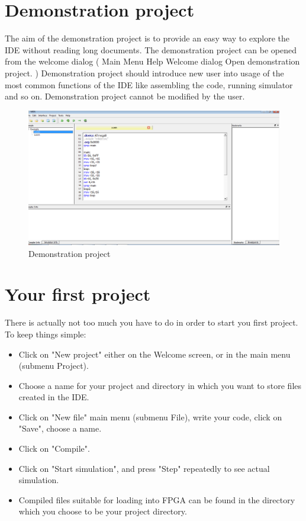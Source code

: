 
\section{Demonstration project}
    The aim of the demonstration project is to provide an easy way to explore the IDE without reading long documents. The demonstration project can be opened from the welcome dialog ( Main Menu Help Welcome dialog Open demonstration project. ) Demonstration project should introduce new user into usage of the most common functions of the IDE like assembling the code, running simulator and so on. Demonstration project cannot be modified by the user.
    \begin{figure}[h]
        \centering{}
        \includegraphics[width=.5\textwidth]{img/Demonstration_project.png}
        \caption{Demonstration project}
    \end{figure}

\section{Your first project}
    There is actually not too much you have to do in order to start you first project. To keep things simple:
    \begin{itemize}
        \item Click on "New project" either on the Welcome screen, or in the main menu (submenu Project).
        \item Choose a name for your project and directory in which you want to store files created in the IDE.
        \item Click on "New file" main menu (submenu File), write your code, click on "Save", choose a name.
        \item Click on "Compile".
        \item Click on "Start simulation", and press "Step" repeatedly to see actual simulation.
        \item Compiled files suitable for loading into FPGA can be found in the directory which you choose to be your project directory.
    \end{itemize}

